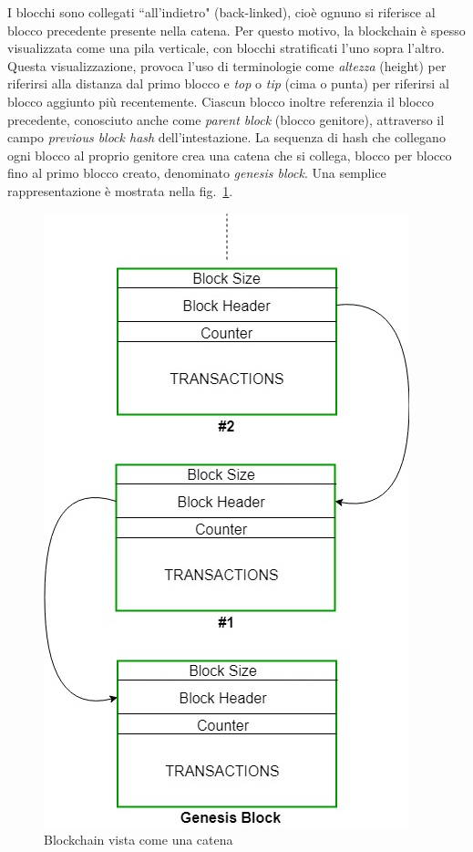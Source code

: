 I blocchi sono collegati ``all'indietro" (back-linked), cio\`e ognuno si riferisce al blocco precedente presente nella catena. Per questo motivo, la blockchain \`e spesso visualizzata come una pila verticale, con blocchi stratificati l’uno sopra l’altro. Questa visualizzazione, provoca l’uso di terminologie come \textit{altezza} (height) per riferirsi alla distanza dal primo blocco e \textit{top} o \textit{tip} (cima o punta) per riferirsi al blocco aggiunto più recentemente.
Ciascun blocco inoltre referenzia il blocco precedente, conosciuto anche come \textit{parent block} (blocco genitore), attraverso il campo \textit{previous block hash} dell'intestazione. La sequenza di hash che collegano ogni blocco al proprio genitore crea una catena che si collega, blocco per blocco fino al primo blocco creato, denominato \textit{genesis block}.
Una semplice rappresentazione \`e mostrata nella fig.~\ref{im:pila}.
\begin{figure}
\centering 
\includegraphics[scale=0.65]{immagini/cap2/2-BC-come-catena} 
\caption{Blockchain vista come una catena}
\label{im:pila} 
\end{figure}
